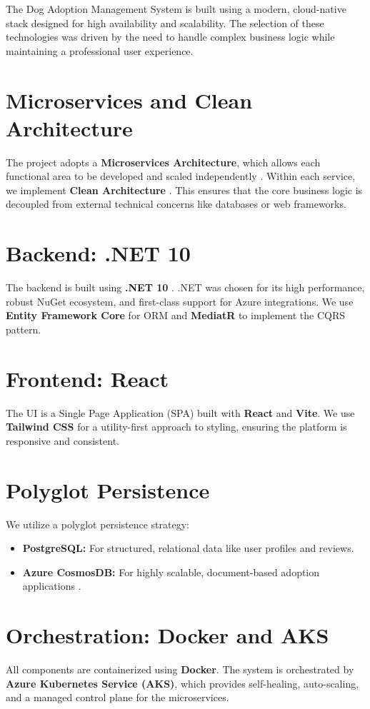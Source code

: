 The Dog Adoption Management System is built using a modern, cloud-native stack designed for high availability and scalability. The selection of these technologies was driven by the need to handle complex business logic while maintaining a professional user experience.

\section{Microservices and Clean Architecture}
The project adopts a \textbf{Microservices Architecture}, which allows each functional area to be developed and scaled independently \cite{microservices_fowler}. Within each service, we implement \textbf{Clean Architecture} \cite{clean_architecture}. This ensures that the core business logic is decoupled from external technical concerns like databases or web frameworks.

\section{Backend: .NET 10}
The backend is built using \textbf{.NET 10} \cite{microsoft_net10}. .NET was chosen for its high performance, robust NuGet ecosystem, and first-class support for Azure integrations. We use \textbf{Entity Framework Core} for ORM and \textbf{MediatR} to implement the CQRS pattern.

\section{Frontend: React}
The UI is a Single Page Application (SPA) built with \textbf{React} and \textbf{Vite}. We use \textbf{Tailwind CSS} for a utility-first approach to styling, ensuring the platform is responsive and consistent.

\section{Polyglot Persistence}
We utilize a polyglot persistence strategy:
\begin{itemize}
    \item \textbf{PostgreSQL:} For structured, relational data like user profiles and reviews.
    \item \textbf{Azure CosmosDB:} For highly scalable, document-based adoption applications \cite{cosmosdb_whitepaper}.
\end{itemize}

\section{Orchestration: Docker and AKS}
All components are containerized using \textbf{Docker}. The system is orchestrated by \textbf{Azure Kubernetes Service (AKS)}, which provides self-healing, auto-scaling, and a managed control plane for the microservices.


